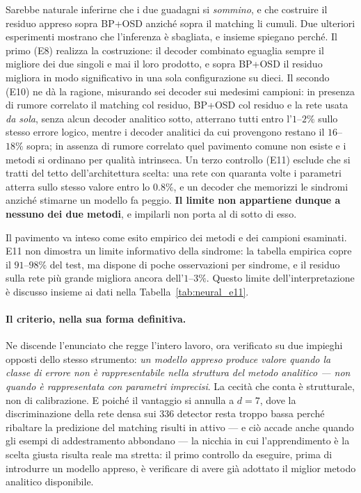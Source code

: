\begin{onehalfspace}
Sarebbe naturale inferirne che i due guadagni si \emph{sommino}, e che costruire il residuo appreso sopra BP+OSD anziché sopra il matching li cumuli. Due ulteriori esperimenti mostrano che l'inferenza è sbagliata, e insieme spiegano perché. Il primo (E8) realizza la costruzione: il decoder combinato eguaglia sempre il migliore dei due singoli e mai il loro prodotto, e sopra BP+OSD il residuo migliora in modo significativo in una sola configurazione su dieci. Il secondo (E10) ne dà la ragione, misurando sei decoder sui medesimi campioni: in presenza di rumore correlato il matching col residuo, BP+OSD col residuo e la rete usata \emph{da sola}, senza alcun decoder analitico sotto, atterrano tutti entro l'$1$--$2\%$ sullo stesso errore logico, mentre i decoder analitici da cui provengono restano il $16$--$18\%$ sopra; in assenza di rumore correlato quel pavimento comune non esiste e i metodi si ordinano per qualità intrinseca. Un terzo controllo (E11) esclude che si tratti del tetto dell'architettura scelta: una rete con quaranta volte i parametri atterra sullo stesso valore entro lo $0.8\%$, e un decoder che memorizzi le sindromi anziché stimarne un modello fa peggio. \textbf{Il limite non appartiene dunque a nessuno dei due metodi}, e impilarli non porta al di sotto di esso.

Il pavimento va inteso come esito empirico dei metodi e dei campioni
esaminati. E11 non dimostra un limite informativo della sindrome: la
tabella empirica copre il $91$--$98\%$ del test, ma dispone di poche
osservazioni per sindrome, e il residuo sulla rete più grande migliora
ancora dell'$1$--$3\%$. Questo limite dell'interpretazione è discusso
insieme ai dati nella Tabella~\ref{tab:neural_e11}.

\paragraph{Il criterio, nella sua forma definitiva.}
Ne discende l'enunciato che regge l'intero lavoro, ora verificato su due impieghi opposti dello stesso strumento: \emph{un modello appreso produce valore quando la classe di errore non è rappresentabile nella struttura del metodo analitico --- non quando è rappresentata con parametri imprecisi}. La cecità che conta è strutturale, non di calibrazione. E poiché il vantaggio si annulla a $d=7$, dove la discriminazione della rete densa sui $336$ detector resta troppo bassa perché ribaltare la predizione del matching risulti in attivo --- e ciò accade anche quando gli esempi di addestramento abbondano --- la nicchia in cui l'apprendimento è la scelta giusta risulta reale ma stretta: il primo controllo da eseguire, prima di introdurre un modello appreso, è verificare di avere già adottato il miglior metodo analitico disponibile.

\end{onehalfspace}
